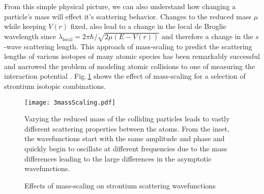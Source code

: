 From this simple physical picture, we can also understand how changing a particle's mass will effect it's scattering behavior.
Changes to the reduced mass $\mu$ while keeping $V(r)$ fixed, also lead to a change in the local de Broglie wavelength since $\lambda_{\text{local}} = 2\pi\hbar/\sqrt{2\mu(E-V(r))}$ and therefore a change in the $s$-wave scattering length.
This approach of mass-scaling to predict the scattering lengths of various isotopes of many atomic species has been remarkably successful and narrowed the problem of modeling atomic collisions to one of measuring the interaction potential \cite{Julienne2009a}.
Fig.\,\ref{fig:3massScaling} shows the effect of mass-scaling for a selection of strontium isotopic combinations.
\begin{figure} 
	\centerline{
	\texttt{[image: 3massScaling.pdf]}}
	\caption{Effects of mass-scaling on strontium scattering wavefunctions}{Varying the reduced mass of the colliding particles leads to vastly different scattering properties between the atoms. From the inset, the wavefunctions start with the same amplitude and phase and quickly begin to oscillate at different frequencies due to the mass differences leading to the large differences in the asymptotic wavefunctions.}
	\label{fig:3massScaling}
\end{figure}  

